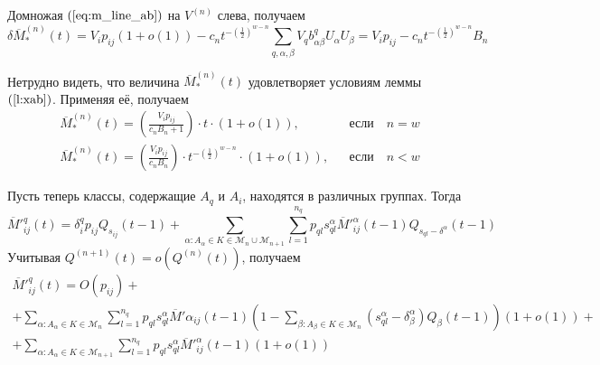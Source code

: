 \documentclass[12pt]{article}
\begin{document}
{Домножая $(\ref{eq:m_line_ab})$ на $V^{(n)}$ слева, получаем
\begin{equation*}
	\delta \overline{M}^{(n)}_*(t) = V_i p_{ij} (1 + o(1)) - c_n t^{-\left(\frac{1}{2}\right)^{w-n}} \sum_{q,\alpha,\beta} V_q b^q_{\alpha \beta} U_\alpha U_\beta = V_i p_{ij} - c_n t^{-\left(\frac{1}{2}\right)^{w-n}} B_n
\end{equation*}

Нетрудно видеть, что величина $\overline{M}^{(n)}_*(t)$ удовлетворяет условиям леммы $(\ref{l:xab})$. Применяя её, получаем
\begin{align*}
	&\overline{M}^{(n)}_*(t) = \left( \frac{V_i p_{ij}}{c_n B_n + 1} \right) \cdot t \cdot (1 + o(1)), & &\text{если}\quad n = w \\
	&\overline{M}^{(n)}_*(t) = \left( \frac{V_i p_{ij}}{c_n B_n} \right) \cdot t^{-\left(\frac{1}{2}\right)^{w-n}} \cdot (1 + o(1)), & &\text{если}\quad n < w
\end{align*}

Пусть теперь классы, содержащие $A_q$ и $A_i$, находятся в различных группах. Тогда
\begin{equation*}
	\overline{M}'^q_{ij}(t) = \delta^q_i p_{ij} Q_{s_{ij}}(t-1) + \sum_{\alpha : A_\alpha \in K \in \mathcal{M}_n \cup \mathcal{M}_{n+1}} \sum_{l = 1}^{n_q} p_{ql} s_{ql}^\alpha \overline{M}'^\alpha_{ij}(t-1) Q_{s_{ql} - \delta^\alpha}(t-1)
\end{equation*}
Учитывая $Q^{(n+1)}(t) = o(Q^{(n)}(t))$, получаем
\begin{multline*}
\label{eq:muv}
	\overline{M}'^q_{ij}(t) = O(p_{ij}) + \\
	+ \sum_{\alpha : A_\alpha \in K \in \mathcal{M}_n} \sum_{l = 1}^{n_q} p_{ql} s_{ql}^\alpha \overline{M}'\alpha_{ij}(t-1) \left( 1 - \sum_{\beta : A_\beta \in K \in \mathcal{M}_n} (s_{ql}^\alpha - \delta^\alpha_\beta) Q_\beta(t-1) \right) (1 + o(1)) + \\
	+ \sum_{\alpha : A_\alpha \in K \in \mathcal{M}_{n+1}} \sum_{l = 1}^{n_q} p_{ql} s_{ql}^\alpha \overline{M}'^\alpha_{ij}(t-1) (1 + o(1))
\end{multline*}

}
\end{document}
